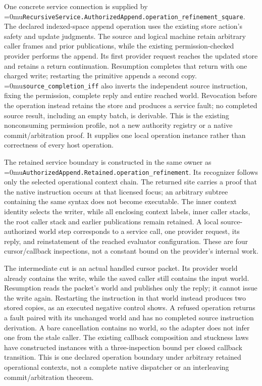 \documentclass[11pt,a4paper]{article}
\newcommand{\name}[1]{\textup{\Urlmuskip=0mu\relax\nolinkurl{#1}}}
\begin{document}
One concrete service connection is supplied by
\name{RecursiveService.AuthorizedAppend.operation_refinement_square}.
The declared indexed-space append operation uses the existing store action's
safety and update judgments. The source and logical machine retain arbitrary
caller frames and prior publications, while the existing permission-checked
provider performs the append. Its first provider request reaches the updated
store and retains a return continuation. Resumption completes that return
with one charged write; restarting the primitive appends a second copy.
\name{source_completion_iff} also inverts the independent source instruction,
fixing the permission, complete reply and entire reached world. Revocation
before the operation instead retains the store and produces a service fault;
no completed source result, including an empty batch, is derivable. This is the existing
nonconsuming permission profile, not a new authority registry or a native
commit/arbitration proof. It supplies one local operation instance rather
than correctness of every host operation.

The retained service boundary is constructed in the same owner as
\name{AuthorizedAppend.Retained.operation_refinement}. Its recognizer follows
only the selected operational context chain. The returned site carries a
proof that the native instruction occurs at that licensed focus; an arbitrary
subtree containing the same syntax does not become executable. The inner
context identity selects the writer, while all enclosing context labels,
inner caller stacks, the root caller stack and earlier publications remain
retained. A local source-authorized world step corresponds to a service call,
one provider request, its reply, and reinstatement of the reached evaluator
configuration. These are four cursor/callback inspections, not a constant
bound on the provider's internal work.

The intermediate cut is an actual handled cursor packet. Its provider world
already contains the write, while the saved caller still contains the input
world. Resumption reads the packet's world and publishes only the reply;
it cannot issue the write again. Restarting the instruction in that world
instead produces two stored copies, as an executed negative control shows.
A refused operation returns a fault paired with its unchanged world and has
no completed source instruction derivation. A bare cancellation contains no
world, so the adapter does not infer one from the stale caller. The existing
callback composition and stuckness laws have constructed instances with a
three-inspection bound per closed callback transition. This is one declared
operation boundary under arbitrary retained operational contexts, not a
complete native dispatcher or an interleaving commit/arbitration theorem.
\end{document}

